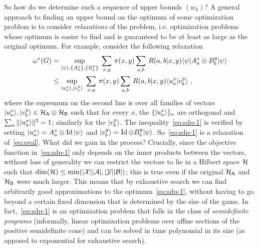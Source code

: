 So how do we determine such a sequence of upper bounds $(w_k)$?
A general approach to finding an upper bound on the optimum of some optimization problem is to consider \emph{relaxations} of the problem, i.e.
 optimization problems whose optimum is easier to find and is guaranteed to be at least as large as the original optimum. For example, consider the following relaxation
\begin{align}
\omega^*(G) &=\sup_{|\psi\rangle, \{A^x_a\},\{B^y_b\}} \; \sum_{x,y}\, \pi(x,y) \sum_{a,b} \,R(a,b|x,y) \langle\psi| A^x_a \otimes B^y_b |\psi\rangle\notag \\
&\leq \sup_{|u^x_a\rangle,|v^y_b\rangle }\; \sum_{x,y} \,\pi(x,y) \sum_{a,b}\, R(a,b|x,y) \langle u^x_a | v^y_b\rangle\;,\label{eq:sdp-1}
\end{align}
where the supremum on the second line is over all families of vectors $|u^x_a\rangle,|v^y_b\rangle \in \mathcal{H}_{\textsf{A}}\otimes \mathcal{H}_{\textsf{B}}$ such that for every $x$, the $\{|u^x_a\rangle\}_a$ are orthogonal and $\sum_a \||u^x_a\rangle\|^2 = 1$; similarly for the $|v^y_b\rangle$. The inequality~\eqref{eq:sdp-1} is verified by setting $|u^x_a\rangle = A^x_a \otimes \mathop{\rm Id}\nolimits |\psi\rangle$ and $|v^y_b\rangle = \mathop{\rm Id}\nolimits \otimes B^y_b |\psi\rangle$. So~\eqref{eq:sdp-1} is a relaxation of~\eqref{eq:qval}. What did we gain in the process? Crucially, since the objective function in~\eqref{eq:sdp-1} only depends on the inner products between the vectors, without loss of generality we can restrict the vectors to lie in a Hilbert space $\mathcal{H}$ such that $\dim(\mathcal{H}) \leq \min( |\mathcal{X}||\mathcal{A}|,|\mathcal{Y}||\mathcal{B}|)$; this is true even if the original $\mathcal{H}_{\textsf{A}}$ and $\mathcal{H}_{\textsf{B}}$ were much larger. This means that by exhaustive search we can find arbitrarily good approximations to the optimum~\eqref{eq:sdp-1}, without having to go beyond a certain fixed dimension that is determined by the size of the game. In fact,~\eqref{eq:sdp-1} is an optimization problem that falls in the class of \emph{semidefinite programs} (informally, linear optimization problems over affine sections of the positive semidefinite cone) and can be solved in time polynomial in its size (as opposed to exponential for exhaustive search). 

